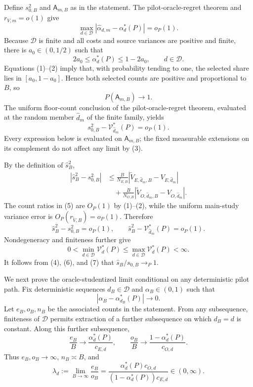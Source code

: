 Define \(s_{0,B}^2\) and \(\mathsf A_{m,B}\) as in the statement.  The pilot-oracle-regret theorem and \(r_{V,m}=o(1)\) give
\[
 \max_{d\in\mathcal D}
 |\widehat\alpha_{d,m}-\alpha_d^*(P)|=o_P(1).               \tag{1}
\]
Because \(\mathcal D\) is finite and all costs and source variances are positive and finite, there is \(a_0\in(0,1/2)\) such that
\[
 2a_0\le \alpha_d^*(P)\le1-2a_0,
 \qquad d\in\mathcal D.                                    \tag{2}
\]
Equations (1)--(2) imply that, with probability tending to one, the selected share lies in \([a_0,1-a_0]\).  Hence both selected counts are positive and proportional to \(B\), so
\[
 P(\mathsf A_{m,B})\longrightarrow1.                        \tag{3}
\]
The uniform floor-count conclusion of the pilot-oracle-regret theorem, evaluated at the random member \(\widehat d_m\) of the finite family, yields
\[
 s_{0,B}^2-\mathcal V_{\widehat d_m}^*(P)=o_P(1).            \tag{4}
\]
Every expression below is evaluated on \(\mathsf A_{m,B}\); the fixed measurable extensions on its complement do not affect any limit by (3).

By the definition of \(\widehat s_B^2\),
\[
\begin{aligned}
 |\widehat s_B^2-s_{0,B}^2|
 &\le \frac{B}{N_{E,B}}
 |\widetilde V_{E,\widehat d_m,B}-V_{E,\widehat d_m}|\\
 &\quad+\frac{B}{N_{O,B}}
 |\widetilde V_{O,\widehat d_m,B}-V_{O,\widehat d_m}|.
\end{aligned}                                                \tag{5}
\]
The count ratios in (5) are \(O_P(1)\) by (1)--(2), while the uniform main-study variance error is \(O_P(r_{\widetilde V,B})=o_P(1)\).  Therefore
\[
 \widehat s_B^2-s_{0,B}^2=o_P(1),
 \qquad
 \widehat s_B^2-\mathcal V_{\widehat d_m}^*(P)=o_P(1).      \tag{6}
\]
Nondegeneracy and finiteness further give
\[
 0<\min_{d\in\mathcal D}\mathcal V_d^*(P)
 \le \max_{d\in\mathcal D}\mathcal V_d^*(P)<\infty.      \tag{7}
\]
It follows from (4), (6), and (7) that \(\widehat s_B/s_{0,B}\to_P1\).

We next prove the oracle-studentized limit conditional on any deterministic pilot path.  Fix deterministic sequences \(d_B\in\mathcal D\) and \(\alpha_B\in(0,1)\) such that
\[
 |\alpha_B-\alpha_{d_B}^*(P)|\longrightarrow0.              \tag{8}
\]
Let \(e_B,o_B,n_B\) be the associated counts in the statement.  From any subsequence, finiteness of \(\mathcal D\) permits extraction of a further subsequence on which \(d_B=d\) is constant.  Along this further subsequence,
\[
 \frac{e_B}{B}\longrightarrow\frac{\alpha_d^*(P)}{c_{E,d}},
 \qquad
 \frac{o_B}{B}\longrightarrow\frac{1-\alpha_d^*(P)}{c_{O,d}}. \tag{9}
\]
Thus \(e_B,o_B\to\infty\), \(n_B\asymp B\), and
\[
 \lambda_d:=\lim_{B\to\infty}\frac{e_B}{o_B}
 =\frac{\alpha_d^*(P)c_{O,d}}
 {(1-\alpha_d^*(P))c_{E,d}}\in(0,\infty).                  \tag{10}
\]

